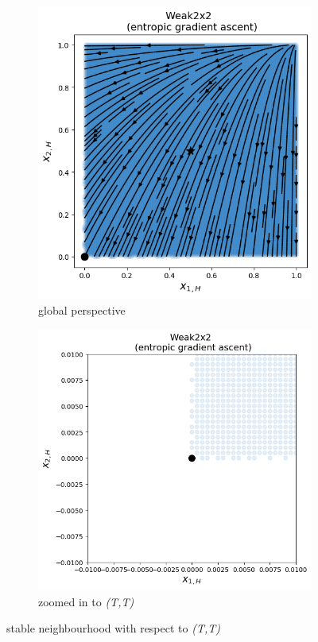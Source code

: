 \begin{figure}[H]
\captionsetup{justification=centering}
\centering
\begin{subfigure}{.47\textwidth}
    \centering
    \includegraphics[width=\textwidth]{logos/Weak2x2-3.png}
    \caption{global perspective}
    \label{fig:Weak2x2-2a}
\end{subfigure}%
\begin{subfigure}{.53\textwidth}
    \centering
    \includegraphics[width=\textwidth]{logos/Weak2x2-6.png}
    \caption{zoomed in to \textit{(T,T)}}
    \label{fig:Weak2x2-2b}
\end{subfigure}
\caption{stable neighbourhood with respect to \textit{(T,T)}}
\label{fig:Weak2x2-2}
\end{figure}

